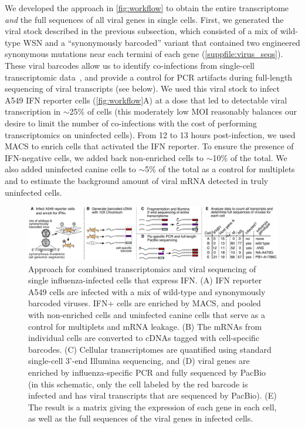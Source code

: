 \documentclass[]{asm-article}
\newcommand{\FIG}[1]{\autoref{fig:#1}}
\newcommand{\SUPPFILE}[1]{\autoref{suppfile:#1}}
\begin{document}
We developed the approach in \FIG{workflow} to obtain the entire transcriptome \emph{and} the full sequences of all viral genes in single cells.
First, we generated the viral stock described in the previous subsection, which consisted of a mix of wild-type WSN and a ``synonymously barcoded'' variant that contained two engineered synonymous mutations near each termini of each gene (\SUPPFILE{virus_seqs}).
These viral barcodes allow us to identify co-infections from single-cell transcriptomic data~\cite{russell2018extreme}, and provide a control for PCR artifacts during full-length sequencing of viral transcripts (see below).
We used this viral stock to infect A549 IFN reporter cells (\FIG{workflow}A) at a dose that led to detectable viral transcription in $\sim$25\% of cells (this moderately low MOI reasonably balances our desire to limit the number of co-infections with the cost of performing transcriptomics on uninfected cells).
From 12 to 13 hours post-infection, we used MACS to enrich cells that activated the IFN reporter.
To ensure the presence of IFN-negative cells, we added back non-enriched cells to $\sim$10\% of the total.
We also added uninfected canine cells to $\sim$5\% of the total as a control for multiplets and to estimate the background amount of viral mRNA detected in truly uninfected cells.

\begin{figure}
\begin{fullwidth}

\includegraphics[width=\linewidth, valign=t]{figures/WorkflowSchematic/SchematicForPaper.pdf}

\caption{
Approach for combined transcriptomics and viral sequencing of single influenza-infected cells that express IFN.
(A)
IFN reporter A549 cells are infected with a mix of wild-type and synonymously barcoded viruses.
IFN+ cells are enriched by MACS, and pooled with non-enriched cells and uninfected canine cells that serve as a control for multiplets and mRNA leakage.
(B)
The mRNAs from individual cells are converted to cDNAs tagged with cell-specific barcodes.
(C)
Cellular transcriptomes are quantified using standard single-cell 3'-end Illumina sequencing, and 
(D)
viral genes are enriched by influenza-specific PCR and fully sequenced by PacBio (in this schematic, only the cell labeled by the red barcode is infected and has viral transcripts that are sequenced by PacBio).
(E)
The result is a matrix giving the expression of each gene in each cell, as well as the full sequences of the viral genes in infected cells.
}
\label{fig:workflow}

\end{fullwidth}
\end{figure}
\end{document}
